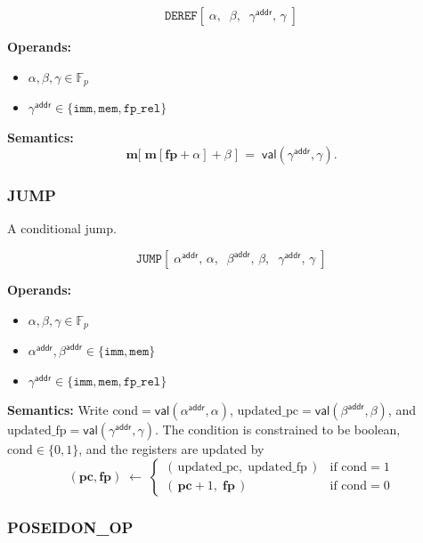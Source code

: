 \documentclass{article}
\theoremstyle{definition}
\newcommand{\Fp}{\mathbb F_p}
\begin{document}
\[
\texttt{DEREF}[\;\alpha,\;\; \beta,\;\; \gamma^\textsf{addr},\, \gamma\;]
\]

\textbf{Operands:}
\begin{itemize}
    \item $\alpha, \beta, \gamma \in \Fp$
    \item $\gamma^\textsf{addr} \in \{\texttt{imm}, \texttt{mem}, \texttt{fp\_rel}\}$
\end{itemize}

\textbf{Semantics:}
\[
\textbf{m}\big[\;\textbf{m}[\textbf{fp} + \alpha] + \beta\;\big] \;=\; \mathsf{val}(\gamma^\textsf{addr}, \gamma).
\]

\subsubsection{JUMP} \label{sec:jump}

A conditional jump.

\[
\texttt{JUMP}[\;\alpha^\textsf{addr},\, \alpha,\;\; \beta^\textsf{addr},\, \beta,\;\; \gamma^\textsf{addr},\, \gamma\;]
\]

\textbf{Operands:}
\begin{itemize}
    \item $\alpha, \beta, \gamma \in \Fp$
    \item $\alpha^\textsf{addr}, \beta^\textsf{addr} \in \{\texttt{imm}, \texttt{mem}\}$
    \item $\gamma^\textsf{addr} \in \{\texttt{imm}, \texttt{mem}, \texttt{fp\_rel}\}$
\end{itemize}

\textbf{Semantics:} Write $\text{cond} = \mathsf{val}(\alpha^\textsf{addr}, \alpha)$, $\text{updated\_pc} = \mathsf{val}(\beta^\textsf{addr}, \beta)$, and $\text{updated\_fp} = \mathsf{val}(\gamma^\textsf{addr}, \gamma)$. The condition is constrained to be boolean, $\text{cond} \in \{0, 1\}$, and the registers are updated by
\[
(\textbf{pc}, \textbf{fp}) \;\gets\;
\begin{cases}
(\,\text{updated\_pc},\; \text{updated\_fp}\,) & \text{if } \text{cond} = 1 \\[2mm]
(\,\textbf{pc} + 1,\; \textbf{fp}\,) & \text{if } \text{cond} = 0
\end{cases}
\]


\subsubsection{POSEIDON\_OP}\label{sec:poseidon-op}
\end{document}
